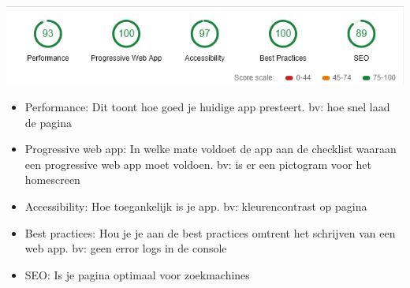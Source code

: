 	\includegraphics[scale=1]{img/audit.png}


\begin{itemize}  
	\item Performance: Dit toont hoe goed je huidige app presteert. bv: hoe snel laad de pagina
	\item Progressive web app: In welke mate voldoet de app aan de checklist waaraan een progressive web app moet voldoen. bv: is er een pictogram voor het homescreen
	\item Accessibility: Hoe toegankelijk is je app. bv: kleurencontrast op pagina
	\item Best practices: Hou je je aan de best practices omtrent het schrijven van een web app. bv: geen error logs in de console
	\item SEO: Is je pagina optimaal voor zoekmachines
\end{itemize}

